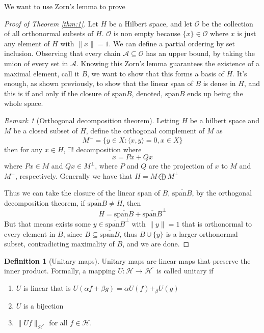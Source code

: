 \documentclass[13pt]{article}
\theoremstyle{definition} --- default
\theoremstyle{definition}
\newtheorem{definition}[theorem]{Definition}
\theoremstyle{remark}
\newtheorem{remark}[theorem]{Remark}
\begin{document}
We want to use Zorn's lemma to prove 
\begin{proof}[Proof of Theorem \ref{thm:1}]
    Let $H$ be a Hilbert space, and let $\mathcal{O}$ be the collection of all orthonormal subsets of $H$. $\mathcal{O}$ is non empty because $\{x\} \in \mathcal{O}$ where $x$ is just any element of $H$ with $\|x\| = 1$. We can define a partial ordering by set inclusion. Observing that every chain $\mathcal{A} \subseteq \mathcal{O}$ has an upper bound, by taking the union of every set in $\mathcal{A}$. Knowing this Zorn's lemma guarantees the existence of a maximal element, call it $B$, we want to show that this forms a basis of $H$. It's enough, as shown previously, to show that the linear span of $B$ is dense in $H$, and this is if and only if the closure of $\text{span}B$, denoted, $\overline{\text{span}B}$ ends up being the whole space. 
    
    \begin{remark}[Orthogonal decomposition theorem]
        Letting $H$ be a hilbert space and $M$ be a closed subset of $H$, define the orthogonal complement of $M$ as 
        $$M^{\perp} = \{ y \in X \colon \langle x,y \rangle = 0, x \in X\}$$ 
        then for any $x \in H$, $\exists! $ decomposition where 
        $$x = Px + Qx$$
        where $Px \in M$ and $Qx \in M^\perp$, where $P$ and $Q$ are the projection of $x$ to $M$ and $M^\perp$, respectively. Generally we have that 
        $H = M \bigoplus M^\perp$
        
    \end{remark}
    Thus we can take the closure of the linear span of $B$, $\overline{\text{span} B}$, by the orthogonal decomposition theorem, if $\overline{\text{span}B} \neq H$, then 
    $$ H = \overline{\text{span}B} + \overline{\text{span}B}^\perp$$
    But that means exists some $y \in \overline{\text{span}B}^\perp$ with $\|y\| = 1$ that is orthonormal to every element in $B$, since $B \subseteq \overline{\text{span}B}$, thus $B \cup \{y\}$ is a larger orthonormal subset, contradicting maximality of $B$, and we are done.
\end{proof}
\begin{definition}[Unitary maps]
	Unitary maps are linear maps that preserve the inner product. Formally, a mapping $U \colon \mathcal{H} \to \mathcal{H}^\prime$ is called unitary if
	\begin{enumerate}
		\item $U$ is linear that is $U(\alpha f + \beta g) = \alpha U(f) +_ \beta U(g)$
		\item $U$ is a bijection
		\item $\|Uf\|_{\mathcal{H}^\prime}$ for all $f \in \mathcal{H}$.


	\end{enumerate}

	
\end{definition}
\end{document}
